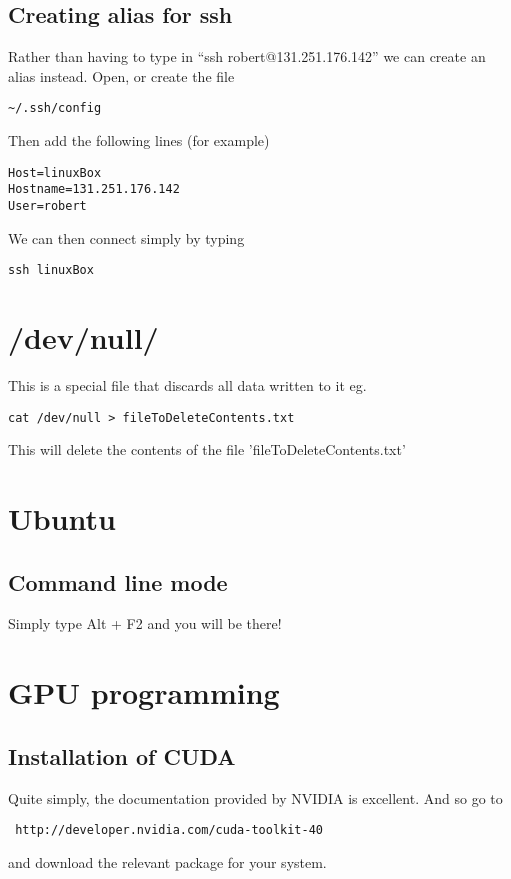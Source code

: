 \documentclass[a4paper, 10pt]{article}
\begin{document}
\subsection*{Creating alias for ssh}

Rather than having to type in ``ssh robert@131.251.176.142'' we can create an alias instead. Open, or create the file 
\begin{verbatim}
~/.ssh/config
\end{verbatim}
Then add the following lines (for example)
\begin{verbatim}
Host=linuxBox
Hostname=131.251.176.142
User=robert
\end{verbatim}
We can then connect simply by typing
\begin{verbatim}
ssh linuxBox
\end{verbatim}

\section*{/dev/null/}

This is a special file that discards all data written to it eg.
\begin{verbatim}
cat /dev/null > fileToDeleteContents.txt
\end{verbatim}
This will delete the contents of the file 'fileToDeleteContents.txt'

\section*{Ubuntu}

\subsection*{Command line mode}

Simply type Alt + F2 and you will be there!

\section*{GPU programming}

\subsection*{Installation of CUDA}

Quite simply, the documentation provided by NVIDIA is excellent. And so go to
\begin{verbatim}
 http://developer.nvidia.com/cuda-toolkit-40
 \end{verbatim}
and download the relevant package for your system.
\end{document}
